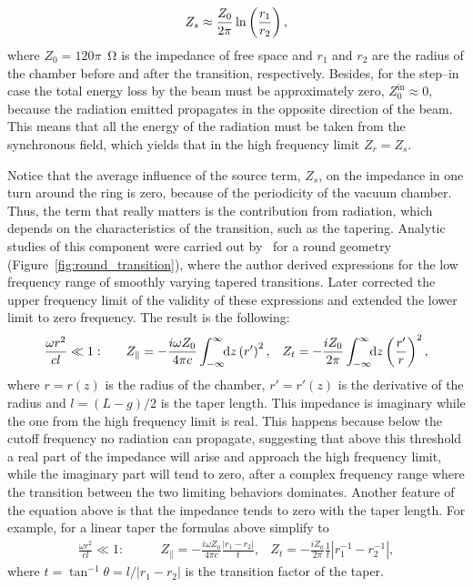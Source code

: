     \begin{align}\label{eq:transition_high_frequency}
        Z_s \approx \frac{Z_0}{2\pi}\ln\left(\frac{r_1}{r_2}\right),
    \end{align}
    where $Z_0 = 120\pi$~\si{\ohm} is the impedance of free space and $r_1$ and $r_2$ are the radius of the chamber before and after the transition, respectively. Besides, for the step--in case the total energy loss by the beam must be approximately zero, $Z_0^\text{in}\approx 0$, because the radiation emitted propagates in the opposite direction of the beam. This means that all the energy of the radiation must be taken from the synchronous field, which yields that in the high frequency limit $Z_r = Z_s$.

    Notice that the average influence of the source term, $Z_s$, on the impedance in one turn around the ring is zero, because of the periodicity of the vacuum chamber. Thus, the term that really matters is the contribution from radiation, which depends on the characteristics of the transition, such as the tapering. Analytic studies of this component were carried out by~ for a round geometry (Figure~\ref{fig:round_transition}), where the author derived expressions for the low frequency range of smoothly varying tapered transitions. Later  corrected the upper frequency limit of the validity of these expressions and extended the lower limit to zero frequency. The result is the following:
    \begin{align}
        \frac{\omega r^2}{cl}\ll1:\quad\quad
        &Z_\parallel = -\frac{i\omega Z_0}{4\pi c}\int_{-\infty}^{\infty}\!\!\text{d}z \left(r'\right)^2, &
        Z_t = -\frac{i Z_0}{2\pi}\int_{-\infty}^{\infty}\!\!\text{d}z \left(\frac{r'}{r}\right)^2,
    \end{align}
    where $r=r(z)$ is the radius of the chamber, $r'=r'(z)$ is the derivative of the radius and $l=(L-g)/2$ is the taper length. This impedance is imaginary while the one from the high frequency limit is real. This happens because below the cutoff frequency no radiation can propagate, suggesting that above this threshold a real part of the impedance will arise and approach the high frequency limit, while the imaginary part will tend to zero, after a complex frequency range where the transition between the two limiting behaviors dominates. Another feature of the equation above is that the impedance tends to zero with the taper length. For example, for a linear taper the formulas above simplify to
    \begin{align}
        \frac{\omega r^2}{cl}\ll1:\quad\quad
        &Z_\parallel = -\frac{i\omega Z_0}{4\pi c}\frac{|r_1-r_2|}{t}, &
        Z_t = -\frac{i Z_0}{2\pi}\frac1t|r_1^{-1}-r_2^{-1}|,
    \end{align}
    where $t=\tan^{-1}\theta=l/|r_1-r_2|$ is the transition factor of the taper.

